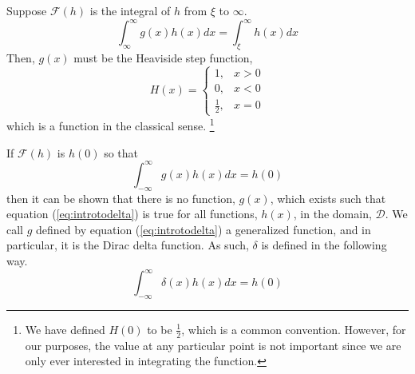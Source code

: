 \begin{example}
    Suppose \(\mathcal{F}(h)\) is the integral of \(h\) from \(\xi\) to \(\infty\).
    \begin{equation}
        \int_{\infty}^{\infty} g(x)h(x)dx = \int_{\xi}^{\infty} h(x) dx
    \end{equation}
    Then, \(g(x)\) must be the Heaviside step function,
    \begin{equation}
        H(x) = \begin{cases}
            1, & x>0\\
            0, & x<0\\
            \frac{1}{2}, & x=0
        \end{cases}
    \end{equation}
    which is a function in the classical sense. \footnote{We have defined \(H(0)\) to be \(\frac{1}{2}\), which is a common convention. However, for our purposes, the value at any particular point is not important since we are only ever interested in integrating the function.}    
\end{example}

If \(\mathcal{F}(h)\) is \(h(0)\) so that
\begin{equation}\label{eq:introtodelta}
    \int_{-\infty}^{\infty}g(x)h(x) dx=h(0)
\end{equation}
then it can be shown that there is no function, \(g(x)\), which exists such that equation (\ref{eq:introtodelta}) is true for all functions, \(h(x)\), in the domain, \(\mathcal{D}\). We call \(g\) defined by equation (\ref{eq:introtodelta}) a generalized function, and in particular, it is the Dirac delta function. As such, \(\delta\) is defined in the following way.
\begin{equation}\label{eq:deltadef}
    \int_{-\infty}^{\infty} \delta(x)h(x) dx = h(0)
\end{equation}


